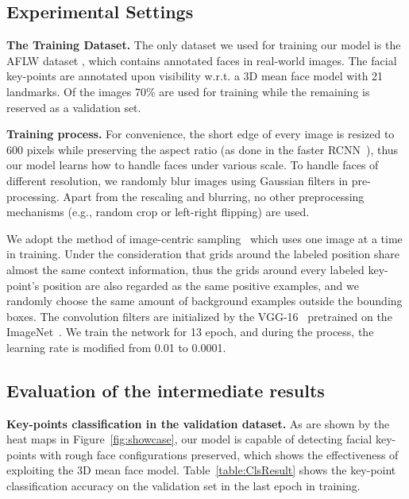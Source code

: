 \documentclass[runningheads]{llncs}
\begin{document}
\subsection{Experimental Settings}

\textbf{The Training Dataset.} The only dataset we used for training our model is the AFLW dataset \cite{AFLW}, which contains  annotated faces in real-world images. The facial key-points are annotated upon visibility w.r.t. a 3D mean face model with 21 landmarks.  Of the images 70\% are used for training while the remaining is reserved as  a validation set.

\textbf{Training process.} For convenience, the short edge of every image is resized to 600 pixels while preserving the aspect ratio (as done in the faster RCNN~\cite{FasterRCNN}), thus our model learns how to handle faces under various scale. To handle faces of different resolution, we randomly blur images using Gaussian filters in pre-processing. Apart from the rescaling and blurring, no other preprocessing mechanisms (e.g., random crop or left-right flipping) are used. 

We adopt the method of image-centric sampling~\cite{FastRCNN,FasterRCNN} which uses one image at a time in training. Under the consideration that grids around the labeled position share almost the same context information, thus the  grids around every labeled key-point's position are also regarded as the same positive examples, and we randomly choose the same amount of background examples outside the bounding boxes. The convolution filters are initialized by the VGG-16~\cite{VGG} pretrained on the ImageNet~\cite{ImageNet}. We train the network for 13 epoch, and during the process, the learning rate is modified from 0.01 to 0.0001.

\subsection{Evaluation of the intermediate results}
\textbf{Key-points classification in the validation dataset.} As are shown by the heat maps in Figure~\ref{fig:showcase}, our model is capable of detecting facial key-points with rough face configurations preserved, which shows the effectiveness of exploiting the 3D mean face model. Table~\ref{table:ClsResult} shows the key-point classification accuracy  on the validation set in the last epoch in training.
\end{document}
